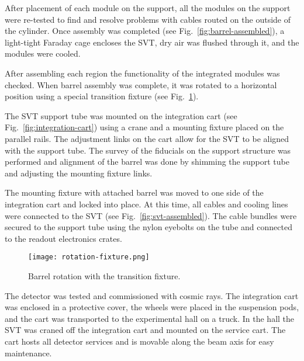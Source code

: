 After placement of each module on the support, all the modules on the support were re-tested to find and resolve problems with cables routed on the outside of the cylinder. Once assembly was completed (see Fig.~\ref{fig:barrel-assembled}), a light-tight Faraday cage encloses the SVT, dry air was flushed through it, and the modules were cooled. 

%

After assembling each region the functionality of the integrated modules was checked. When barrel assembly was complete, it was rotated to a horizontal position using a special transition fixture (see Fig.~\ref{fig:rotation-fixture}). 

The SVT support tube was mounted on the integration cart (see Fig.~\ref{fig:integration-cart}) using a crane and a mounting fixture placed on the parallel rails. The adjustment links on the cart allow for the SVT to be aligned with the support tube. The survey of the fiducials on the support structure was performed and alignment of the barrel was done by shimming the support tube and adjusting the mounting fixture links. 

The mounting fixture with attached barrel was moved to one side of the integration cart and locked into place. At this time, all cables and cooling lines were connected to the SVT (see Fig.~\ref{fig:svt-assembled}). The cable bundles were secured to the support tube using the nylon eyebolts on the tube and connected to the readout electronics crates. 

\begin{figure}[hbt] 
\centering 
\texttt{[image: rotation-fixture.png]}
\caption{Barrel rotation with the transition fixture.}
\label{fig:rotation-fixture}
\end{figure}

The detector was tested and commissioned with cosmic rays. The integration cart was enclosed in a protective cover, the wheels were placed in the suspension pods, and the cart was transported to the experimental hall on a truck. In the hall the SVT was craned off the integration cart and mounted on the service cart. The cart hosts all detector services and is movable along the beam axis for easy maintenance.

